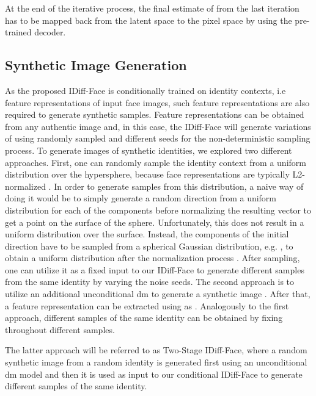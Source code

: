 \documentclass[10pt,twocolumn,letterpaper]{article}
\newcommand{\approachname}{IDiff-Face }
\newcommand{\approachnamewithoutspace}{IDiff-Face}
\begin{document}
At the end of the iterative process, the final estimate of  from the last iteration has to be mapped back from the latent space to the pixel space by using the pre-trained decoder.
\vspace{-1mm}
\subsection{Synthetic Image Generation}
\vspace{-1mm}
As the proposed \approachname is conditionally trained on identity contexts, i.e feature representations of input face images, such feature representations are also required to generate synthetic samples. Feature representations  can be obtained from any authentic image  and, in this case, the \approachname will generate variations of  using randomly sampled  and different seeds for the non-deterministic sampling process. To generate images of synthetic identities, we explored two different approaches. First, one can randomly sample the identity context from a uniform distribution over the hypersphere, because face representations are typically L2-normalized \cite{ElasticFace,CosFace}. In order to generate samples from this distribution, a naive way of doing it would be to simply generate a random direction from a uniform distribution  for each of the components before normalizing the resulting vector to get a point on the surface of the sphere. Unfortunately, this does not result in a uniform distribution over the surface. Instead, the components of the initial direction have to be sampled from a spherical Gaussian distribution, e.g. , to obtain a uniform distribution after the normalization process \cite{Marsaglia1972}. After sampling, one can utilize it as a fixed input to our \approachname to generate different samples from the same identity by varying the noise seeds. 
The second approach is to utilize an additional unconditional \acrshort{dm} to generate a synthetic image . After that, a feature representation  can be extracted using  as . Analogously to the first approach, different samples of the same identity can be obtained by fixing  throughout different samples.

The latter approach will be referred to as Two-Stage \approachnamewithoutspace, where a random synthetic image from a random identity is generated first using an unconditional \acrshort{dm} model and then it is used as input to our conditional \approachname to generate different samples of the same identity.
\end{document}
